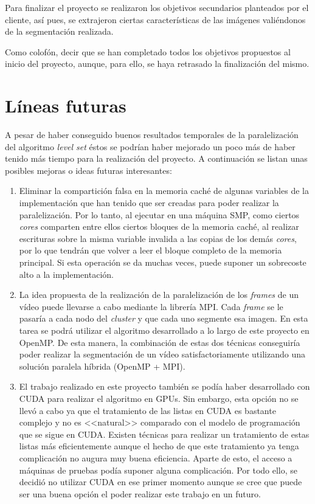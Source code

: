 Para finalizar el proyecto se realizaron los objetivos secundarios planteados por el cliente, as\'{i} pues, se extrajeron ciertas caracter\'{i}sticas de las im\'{a}genes vali\'{e}ndonos de la segmentaci\'{o}n realizada.

Como colof\'{o}n, decir que se han completado todos los objetivos propuestos al inicio del proyecto, aunque, para ello, se haya retrasado la finalizaci\'{o}n del mismo.



\section{L\'{i}neas futuras}\label{propuestaDeMejora}

A pesar de haber conseguido buenos resultados temporales de la paralelizaci\'{o}n del algoritmo \textit{level set} \'{e}stos se podr\'{i}an haber mejorado un poco m\'{a}s de haber tenido m\'{a}s tiempo para la realizaci\'{o}n del proyecto. A continuaci\'{o}n se listan unas posibles mejoras o ideas futuras interesantes:

\begin{enumerate}
	\item Eliminar la compartici\'{o}n falsa en la memoria cach\'{e} de algunas variables de la implementaci\'{o}n que han tenido que ser creadas para poder realizar la paralelizaci\'{o}n. Por lo tanto, al ejecutar en una m\'{a}quina SMP, como ciertos \textit{cores} comparten entre ellos ciertos bloques de la memoria cach\'{e}, al realizar escrituras sobre la misma variable invalida a las copias de los dem\'{a}s \textit{cores}, por lo que tendr\'{a}n que volver a leer el bloque completo de la memoria principal. Si esta operaci\'{o}n se da muchas veces, puede suponer un sobrecoste alto a la implementaci\'{o}n.
	\item La idea propuesta de la realizaci\'{o}n de la paralelizaci\'{o}n de los \textit{frames} de un v\'{i}deo puede llevarse a cabo mediante la librer\'{i}a MPI. Cada \textit{frame} se le pasar\'{i}a a cada nodo del \textit{cluster} y que cada uno segmente esa imagen. En esta tarea se podr\'{a} utilizar el algoritmo desarrollado a lo largo de este proyecto en OpenMP. De esta manera, la combinaci\'{o}n de estas dos t\'{e}cnicas conseguir\'{i}a poder realizar la segmentaci\'{o}n de un v\'{i}deo satisfactoriamente utilizando una soluci\'{o}n paralela h\'{i}brida (OpenMP + MPI).
	\item El trabajo realizado en este proyecto tambi\'{e}n se pod\'{i}a haber desarrollado con CUDA para realizar el algoritmo en GPUs. Sin embargo, esta opci\'{o}n no se llev\'{o} a cabo ya que el tratamiento de las listas en CUDA es bastante complejo y no es <<natural>> comparado con el modelo de programaci\'{o}n que se sigue en CUDA. Existen t\'{e}cnicas para realizar un tratamiento de estas listas m\'{a}s eficientemente aunque el hecho de que este tratamiento ya tenga complicaci\'{o}n no augura muy buena eficiencia. Aparte de esto, el acceso a m\'{a}quinas de pruebas pod\'{i}a suponer alguna complicaci\'{o}n. Por todo ello, se decidi\'{o} no utilizar CUDA en ese primer momento aunque se cree que puede ser una buena opci\'{o}n el poder realizar este trabajo en un futuro. 
\end{enumerate}
